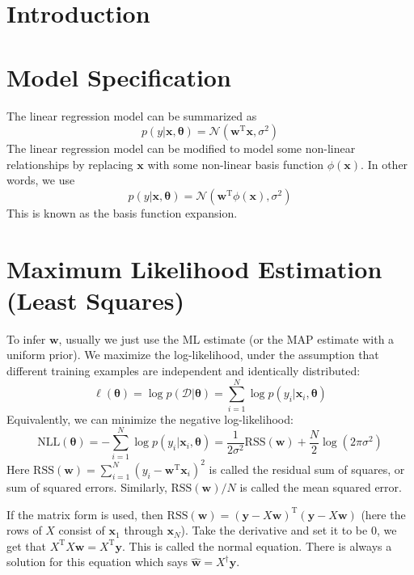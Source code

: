 \documentclass[openany]{book}
\begin{document}
\section{Introduction}

\section{Model Specification}
The linear regression model can be summarized as
\begin{equation}
p(y|\mathbf{x},\boldsymbol{\theta})=\mathcal{N}(\mathbf{w}^{\mathrm{T}}\mathbf{x},\sigma^2)
\end{equation}
The linear regression model can be modified to model some non-linear relationships by replacing $\mathbf{x}$ with some non-linear basis function $\phi(\mathbf{x})$. In other words, we use
\begin{equation}
p(y|\mathbf{x},\boldsymbol{\theta})=\mathcal{N}(\mathbf{w}^{\mathrm{T}}\phi(\mathbf{x}),\sigma^2)
\end{equation}
This is known as the basis function expansion.

\section{Maximum Likelihood Estimation (Least Squares)}
To infer $\mathbf{w}$, usually we just use the ML estimate (or the MAP estimate with a uniform prior). We maximize the log-likelihood, under the assumption that different training examples are independent and identically distributed:
\begin{equation}
\ell(\boldsymbol{\theta})=\log p(\mathcal{D}|\boldsymbol{\theta})=\sum_{i=1}^N\log p(y_i|\mathbf{x}_i,\boldsymbol{\theta})
\end{equation}
Equivalently, we can minimize the negative log-likelihood:
\begin{equation}
\mathrm{NLL}(\boldsymbol{\theta})=-\sum_{i=1}^N\log p(y_i|\mathbf{x}_i,\boldsymbol{\theta})=\frac{1}{2\sigma^2}\mathrm{RSS}(\mathbf{w})+\frac{N}{2}\log (2\pi\sigma^2)
\end{equation}
Here $\mathrm{RSS}(\mathbf{w})=\sum_{i=1}^N(y_i-\mathbf{w}^{\mathrm{T}}\mathbf{x}_i)^2$ is called the residual sum of squares, or sum of squared errors. Similarly, $\mathrm{RSS}(\mathbf{w})/N$ is called the mean squared error.

If the matrix form is used, then $\mathrm{RSS}(\mathbf{w})=(\mathbf{y}-X\mathbf{w})^{\mathrm{T}}(\mathbf{y}-X\mathbf{w})$ (here the rows of $X$ consist of $\mathbf{x}_1$ through $\mathbf{x}_N$). Take the derivative and set it to be 0, we get that $X^{\mathrm{T}}X\mathbf{w}=X^{\mathrm{T}}\mathbf{y}$. This is called the normal equation. There is always a solution for this equation which says $\hat{\mathbf{w}}=X^{\dagger}\mathbf{y}$.
\end{document}
